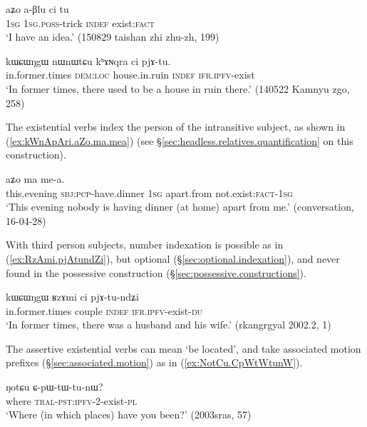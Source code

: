 \begin{exe}
\ex \label{ex:aBlu.ci.tu}
\gll   aʑo a-βlu ci tu \\
\textsc{1sg} \textsc{1sg}.\textsc{poss}-trick \textsc{indef} exist:\textsc{fact} \\
\glt `I have an idea.' (150829 taishan zhi zhu-zh, 199)
\end{exe}

\begin{exe}
\ex \label{ex:khANqra.ci.pjAtu}
\gll   kɯɕɯŋgɯ nɯnɯtɕu kʰɤɴqra ci pjɤ-tu. \\
in.former.times \textsc{dem}:\textsc{loc} house.in.ruin \textsc{indef} \textsc{ifr}.\textsc{ipfv}-exist \\
\glt `In former times, there used to be a house in ruin there.' (140522 Kamnyu zgo, 258)
\end{exe}

The existential verbs index the person of the intransitive subject, as shown in (\ref{ex:kWnApAri.aZo.ma.mea}) (see §\ref{sec:headless.relatives.quantification} on this construction).

\begin{exe}
\ex \label{ex:kWnApAri.aZo.ma.mea}
 aʑo ma me-a. \\
this.evening \textsc{sbj}:\textsc{pcp}-have.dinner \textsc{1sg} apart.from not.exist:\textsc{fact}-\textsc{1sg} \\
\glt `This evening nobody is having dinner (at home) apart from me.'   (conversation, 16-04-28)
\end{exe}

With third person subjects, number indexation is possible as in (\ref{ex:RzAmi.pjAtundZi}), but optional  (§\ref{sec:optional.indexation}), and never found in the possessive construction (§\ref{sec:possessive.constructions}).

\begin{exe}
\ex \label{ex:RzAmi.pjAtundZi}
\gll  kɯɕɯŋgɯ ʁzɤmi ci pjɤ-tu-ndʑi \\
in.former.times couple \textsc{indef} \textsc{ifr}.\textsc{ipfv}-exist-\textsc{du} \\
\glt `In former times, there was a husband and his wife.' (rkangrgyal 2002.2, 1)
 \end{exe}
 
The assertive existential verbs can mean `be located', and take associated motion prefixes (§\ref{sec:associated.motion}) as in (\ref{ex:NotCu.CpWtWtunW}).

 \begin{exe}
\ex \label{ex:NotCu.CpWtWtunW}
\gll  ŋotɕu ɕ-pɯ-tɯ-tu-nɯ? \\
where \textsc{tral}-\textsc{pst}:\textsc{ipfv}-2-exist-\textsc{pl} \\
\glt `Where (in which places) have you been?' (2003sras, 57)
\end{exe} 

